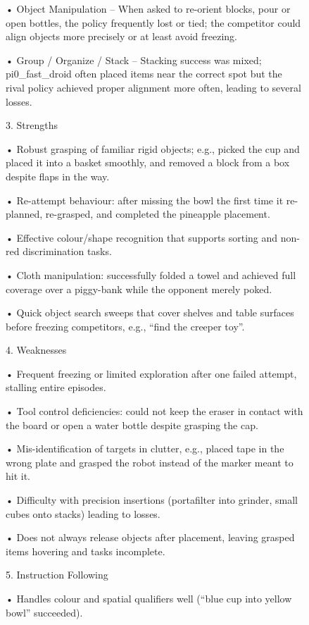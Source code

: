 \begin{figure}[ht!]
{\begin{minipage}{\linewidth}
• Object Manipulation – When asked to re-orient blocks, pour or open bottles, the policy frequently lost or tied; the competitor could align objects more precisely or at least avoid freezing.  \par
• Group / Organize / Stack – Stacking success was mixed; pi0\_fast\_droid often placed items near the correct spot but the rival policy achieved proper alignment more often, leading to several losses. \par
\vspace{1em}
3. Strengths  \par
• Robust grasping of familiar rigid objects; e.g., picked the cup and placed it into a basket smoothly, and removed a block from a box despite flaps in the way.  \par
• Re-attempt behaviour: after missing the bowl the first time it re-planned, re-grasped, and completed the pineapple placement.  \par
• Effective colour/shape recognition that supports sorting and non-red discrimination tasks.  \par
• Cloth manipulation: successfully folded a towel and achieved full coverage over a piggy-bank while the opponent merely poked.  \par
• Quick object search sweeps that cover shelves and table surfaces before freezing competitors, e.g., “find the creeper toy”. \par
\vspace{1em}
4. Weaknesses  \par
• Frequent freezing or limited exploration after one failed attempt, stalling entire episodes.  \par
• Tool control deficiencies: could not keep the eraser in contact with the board or open a water bottle despite grasping the cap.  \par
• Mis-identification of targets in clutter, e.g., placed tape in the wrong plate and grasped the robot instead of the marker meant to hit it.  \par
• Difficulty with precision insertions (portafilter into grinder, small cubes onto stacks) leading to losses.  \par
• Does not always release objects after placement, leaving grasped items hovering and tasks incomplete. \par
\vspace{1em}
5. Instruction Following  \par
• Handles colour and spatial qualifiers well (“blue cup into yellow bowl” succeeded). \par

\end{minipage}}
\end{figure}
